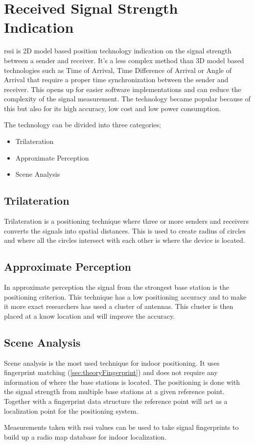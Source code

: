 \section{Received Signal Strength Indication}\label{sec:theoryRssi}
\acrfull{rssi} is 2D model based position technology indication on the signal
strength between a sender and receiver.  It's a less complex method than 3D
model based technologies such as Time of Arrival, Time Difference of Arrival or
Angle of Arrival that require a proper time synchronization between the sender
and receiver.  This opens up for easier software implementations and can reduce
the complexity of the signal measurement.  The technology became popular because
of this but also for its high accuracy, low cost and low power consumption.
\cite{IndoorFingerprintPositioning2017} 

\bigskip

The technology can be divided into three categories; \begin{itemize} \item
Trilateration \item Approximate Perception \item Scene Analysis
\cite{IndoorFingerprintPositioning2017} \end{itemize}

\subsection{Trilateration}\label{sec:theoryRssiTrilateration} Trilateration
is a positioning technique where three or more senders and receivers converts the signals
into spatial distances.  This is used to create radius of circles and where all
the circles intersect with each other is where the device is located.
\cite{IndoorFingerprintPositioning2017} 

\subsection{Approximate Perception}\label{sec:theoryRssiApproxPerception} In
approximate perception the signal from the strongest base station is the
positioning criterion.  This technique has a low positioning accuracy and to
make it more exact researchers has used a cluster of antennas.  This cluster is
then placed at a know location and will improve the
accuracy.\cite{IndoorFingerprintPositioning2017} 

\subsection{Scene Analysis}\label{sec:theoryRssiSceneAnalysis} Scene analysis
is the most used technique for indoor positioning.  It uses fingerprint matching
(\cref{sec:theoryFingerprint}) and does not require any information of where the
base stations is located.  The positioning is done with the signal strength from
multiple base stations at a given reference point.  Together with a fingerprint
data structure the reference point will act as a localization point for the
positioning system.\cite{IndoorFingerprintPositioning2017} 

\bigskip

Measurements taken with \acrshort{rssi} values can be used to take signal
fingerprints to build up a radio map database for indoor
localization.\cite{DevelopmentMobileIndoor2017} 
